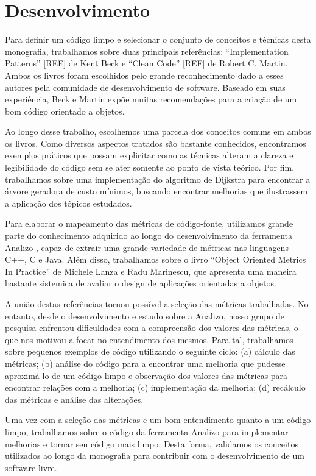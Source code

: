 \section{Desenvolvimento}
\label{sec:desenvolvimento}

Para definir um código limpo e selecionar o conjunto de conceitos e técnicas desta monografia, trabalhamos sobre duas principais referências: 
``Implementation Patterns'' [REF] \cite{} de Kent Beck e ``Clean Code'' [REF] \cite{} de Robert C. Martin. Ambos os livros foram escolhidos 
pelo grande reconhecimento dado a esses autores pela comunidade de desenvolvimento de software. Baseado em suas experiência, Beck e Martin 
expõe muitas recomendações para a criação de um bom código orientado a objetos.

Ao longo desse trabalho, escolhemos uma parcela dos conceitos comuns em ambos os livros. Como diversos aspectos tratados são bastante 
conhecidos, encontramos exemplos práticos que possam explicitar como as técnicas alteram a clareza e legibilidade do código sem se ater 
somente ao ponto de vista teórico. Por fim, trabalhamos sobre uma implementação do algoritmo de Dijkstra para encontrar a árvore geradora de 
custo mínimos, buscando encontrar melhorias que ilustrassem a aplicação dos tópicos estudados.

Para elaborar o mapeamento das métricas de código-fonte, utilizamos grande parte do conhecimento adquirido ao longo do desenvolvimento da 
ferramenta Analizo \cite{}, capaz de extrair uma grande variedade de métricas nas linguagens C++, C e Java. Além disso, trabalhamos sobre o 
livro ``Object Oriented Metrics In Practice'' \cite{} de Michele Lanza e Radu Marinescu, que apresenta uma maneira bastante sistemica de avaliar o design de aplicações orientadas a objetos. 

A união destas referências tornou possível a seleção das métricas trabalhadas. No entanto, desde o desenvolvimento e estudo sobre a Analizo, nosso grupo de pesquisa enfrentou dificuldades com a compreensão dos valores das métricas, o que nos motivou a focar no entendimento dos mesmos. Para tal, trabalhamos sobre pequenos exemplos de código utilizando o seguinte ciclo: (a) cálculo das métricas; (b) análise do código para a encontrar uma melhoria que pudesse aproximá-lo de um código limpo e observação dos valores das métricas para encontrar relações com a melhoria; (c) implementação da melhoria; (d) recálculo das métricas e análise das alterações.

Uma vez com a seleção das métricas e um bom entendimento quanto a um código limpo, trabalhamos sobre o código da ferramenta Analizo para implementar melhorias e tornar seu código mais limpo. Desta forma, validamos os conceitos utilizados ao longo da monografia para contribuir com o desenvolvimento de um software livre.

